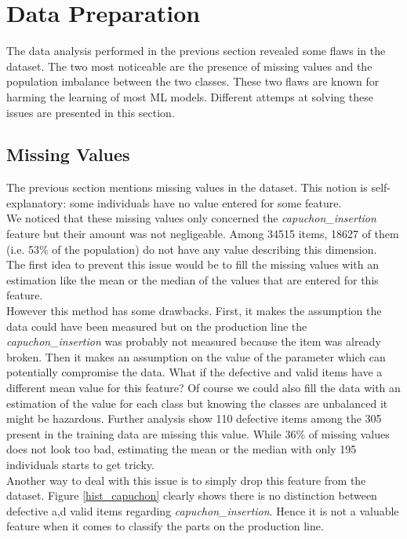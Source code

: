\section{Data Preparation}
The data analysis performed in the previous section revealed some flaws in the dataset. The two most noticeable are the presence of missing values and the population imbalance between the two classes. These two flaws are known for harming the learning of most ML models. Different attemps at solving these issues are presented in this section.

\subsection{Missing Values}
The previous section mentions missing values in the dataset. This notion is self-explanatory: some individuals have no value entered for some feature.\\

We noticed that these missing values only concerned the \textit{capuchon\_insertion} feature but their amount was not negligeable. Among 34515 items, 18627 of them (i.e. 53\% of the population) do not have any value describing this dimension.\\

The first idea to prevent this issue would be to fill the missing values with an estimation like the mean or the median of the values that are entered for this feature.\\

However this method has some drawbacks. First, it makes the assumption the data could have been measured but on the production line the \textit{capuchon\_insertion} was probably not measured because the item was already broken. Then it makes an assumption on the value of the parameter which can potentially compromise the data. What if the defective and valid items have a different mean value for this feature? Of course we could also fill the data with an estimation of the value for each class but knowing the classes are unbalanced it might be hazardous. Further analysis show 110 defective items among the 305 present in the training data are missing this value. While 36\% of missing values does not look too bad, estimating the mean or the median with only 195 individuals starts to get tricky.\\

Another way to deal with this issue is to simply drop this feature from the dataset. Figure \ref{hist_capuchon} clearly shows there is no distinction between defective a,d valid items regarding \textit{capuchon\_insertion}. Hence it is not a valuable feature when it comes to classify the parts on the production line.

